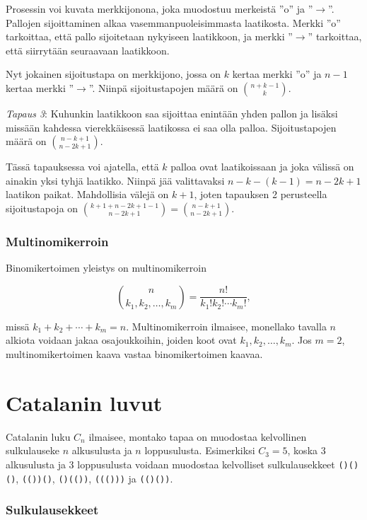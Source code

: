 Prosessin voi kuvata merkkijonona, joka muodostuu
merkeistä ''o'' ja ''$\rightarrow$''.
Pallojen sijoittaminen alkaa
vasemmanpuoleisimmasta laatikosta.
Merkki ''o'' tarkoittaa, että pallo sijoitetaan
nykyiseen laatikkoon, ja merkki
''$\rightarrow$'' tarkoittaa, että siirrytään
seuraavaan laatikkoon.

Nyt jokainen sijoitustapa on merkkijono, jossa
on $k$ kertaa merkki ''o'' ja $n-1$ kertaa
merkki ''$\rightarrow$''.
Niinpä sijoitustapojen määrä on ${n+k-1 \choose k}$.

\textit{Tapaus 3}: Kuhunkin laatikkoon saa sijoittaa
enintään yhden pallon ja lisäksi missään kahdessa
vierekkäisessä laatikossa ei saa olla palloa.
Sijoitustapojen määrä on ${n-k+1 \choose n-2k+1}$.

Tässä tapauksessa voi ajatella, että $k$ palloa
ovat laatikoissaan ja joka välissä on ainakin
yksi tyhjä laatikko.
Niinpä jää valittavaksi $n-k-(k-1)=n-2k+1$ laatikon paikat.
Mahdollisia välejä on $k+1$, joten tapauksen 2 perusteella
sijoitustapoja on ${k+1+n-2k+1-1 \choose n-2k+1} = {n-k+1 \choose n-2k+1}$.

\subsubsection{Multinomikerroin}

Binomikertoimen yleistys on multinomikerroin

\[ {n \choose k_1,k_2,\ldots,k_m} = \frac{n!}{k_1! k_2! \cdots k_m!}, \]

missä $k_1+k_2+\cdots+k_m=n$.
Multinomikerroin ilmaisee, monellako tavalla $n$ alkiota voidaan jakaa osajoukkoihin,
joiden koot ovat $k_1,k_2,\ldots,k_m$.
Jos $m=2$, multinomikertoimen kaava vastaa binomikertoimen kaavaa.

\section{Catalanin luvut}

Catalanin luku $C_n$ ilmaisee,
montako tapaa on muodostaa kelvollinen sulkulauseke
$n$ alkusulusta ja $n$ loppusulusta.
Esimerkiksi $C_3=5$, koska 3 alkusulusta
ja 3 loppusulusta voidaan muodostaa
kelvolliset sulkulausekkeet
\texttt{()()()}, \texttt{(())()},
\texttt{()(())}, \texttt{((()))} ja \texttt{(()())}.

\subsubsection{Sulkulausekkeet}

